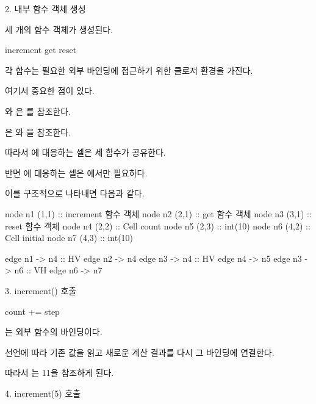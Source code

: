 \begin{dhknote}
\begin{dhksmry}[centered]
2. 내부 함수 객체 생성
\end{dhksmry}
\end{dhknote}

세 개의 함수 객체가 생성된다.

\begin{dhkcode}
increment
get
reset
\end{dhkcode}

각 함수는 필요한 외부 바인딩에 접근하기 위한 클로저 환경을 가진다.

여기서 중요한 점이 있다.

와 은 를 참조한다.

은 와 을 참조한다.

따라서 에 대응하는 셀은 세 함수가 공유한다.

반면 에 대응하는 셀은 에서만 필요하다.

이를 구조적으로 나타내면 다음과 같다.

\begin{dhkdiagram}[in=6]
node n1 (1,1) :: increment 함수 객체
node n2 (2,1) :: get 함수 객체
node n3 (3,1) :: reset 함수 객체
node n4 (2,2) :: Cell count
node n5 (2,3) :: int(10)
node n6 (4,2) :: Cell initial
node n7 (4,3) :: int(10)

edge n1 -> n4 :: HV
edge n2 -> n4
edge n3 -> n4 :: HV
edge n4 -> n5
edge n3 -> n6 :: VH
edge n6 -> n7
\end{dhkdiagram}

\begin{dhknote}
\begin{dhksmry}[centered]
3. increment() 호출
\end{dhksmry}
\end{dhknote}

\begin{dhkcode}
count += step
\end{dhkcode}

는 외부 함수의 바인딩이다.

 선언에 따라 기존 값을 읽고 새로운 계산 결과를 다시 그 바인딩에 연결한다.

따라서 는 11을 참조하게 된다.

\begin{dhknote}
\begin{dhksmry}[centered]
4. increment(5) 호출
\end{dhksmry}
\end{dhknote}

